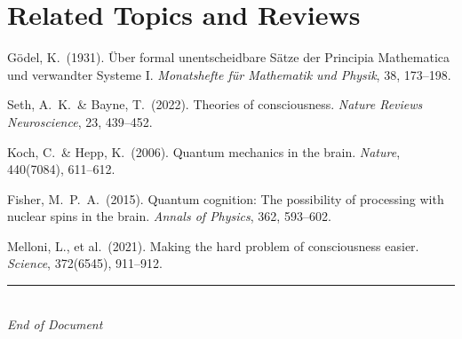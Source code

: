 \documentclass[11pt,a4paper]{report}
\begin{document}
\section*{Related Topics and Reviews}
\begin{enumerate}[label={[\arabic*]}, leftmargin=2.5em, start=21]
  \item G\"odel, K.\ (1931). \"Uber formal unentscheidbare S\"atze der Principia Mathematica und verwandter Systeme I. \textit{Monatshefte f\"ur Mathematik und Physik}, 38, 173--198.
  \item Seth, A.\ K.\ \& Bayne, T.\ (2022). Theories of consciousness. \textit{Nature Reviews Neuroscience}, 23, 439--452.
  \item Koch, C.\ \& Hepp, K.\ (2006). Quantum mechanics in the brain. \textit{Nature}, 440(7084), 611--612.
  \item Fisher, M.\ P.\ A.\ (2015). Quantum cognition: The possibility of processing with nuclear spins in the brain. \textit{Annals of Physics}, 362, 593--602.
  \item Melloni, L., et al.\ (2021). Making the hard problem of consciousness easier. \textit{Science}, 372(6545), 911--912.
\end{enumerate}

\vfill
\begin{center}
  {\color{gray}\rule{0.4\textwidth}{0.5pt}}\\[8pt]
  {\small\color{gray}\itshape End of Document}
\end{center}
\end{document}
